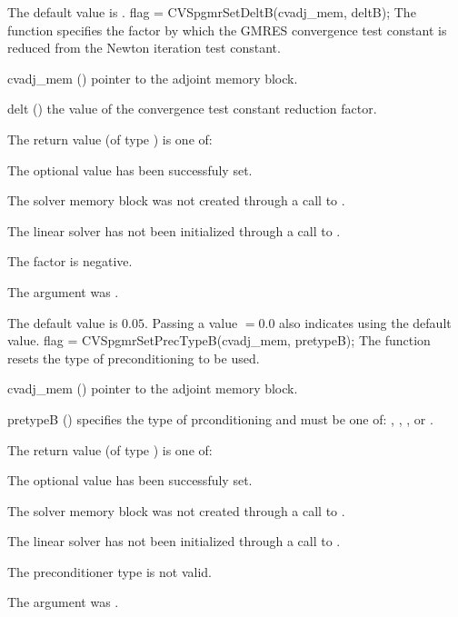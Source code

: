 {
  The default value is .
}
{
  flag = CVSpgmrSetDeltB(cvadj\_mem, deltB);
}
{
  The function  specifies the factor by
  which the GMRES convergence test constant is reduced
  from the Newton iteration test constant.
}
{
  \begin{args}
  \item[cvadj\_mem] ()
    pointer to the adjoint memory block.
  \item[delt] ()
    the value of the convergence test constant reduction factor.
  \end{args}
}
{
  The return value  (of type ) is one of:
  \begin{args}
  \item[\Id{CVSPGMR\_SUCCESS}] 
    The optional value has been successfuly set.
  \item[\Id{CVSPGMR\_MEM\_NULL}]
    The {\cvodes} solver memory block was not created through a call to .
  \item[\Id{CVSPGMR\_LMEM\_NULL}]
    The {\cvspgmr} linear solver has not been initialized through a call to .
  \item[\Id{CVSPGMR\_ILL\_INPUT}]
    The factor  is negative.  
  \item[\Id{CVSPGMR\_ADJMEM\_NULL}]
    The  argument was .
  \end{args}
}
{
  The default value is $0.05$.
  Passing a value $ = 0.0$ also indicates using the default value.
}
{
  flag = CVSpgmrSetPrecTypeB(cvadj\_mem, pretypeB);
}
{
  The function  resets the type
  of preconditioning to be used.
}
{
  \begin{args}
  \item[cvadj\_mem] ()
    pointer to the adjoint memory block.
  \item[pretypeB] ()
    specifies the type of prconditioning and must be one of:
    , , , or .
  \end{args}
}
{
  The return value  (of type ) is one of:
  \begin{args}
  \item[\Id{CVSPGMR\_SUCCESS}] 
    The optional value has been successfuly set.
  \item[\Id{CVSPGMR\_MEM\_NULL}]
    The {\cvodes} solver memory block was not created through a call to .
  \item[\Id{CVSPGMR\_LMEM\_NULL}]
    The {\cvspgmr} linear solver has not been initialized through a call to .
  \item[\Id{CVSPGMR\_ILL\_INPUT}]
    The preconditioner type  is not valid.
  \item[\Id{CVSPGMR\_ADJMEM\_NULL}]
    The  argument was .
  \end{args}
}

